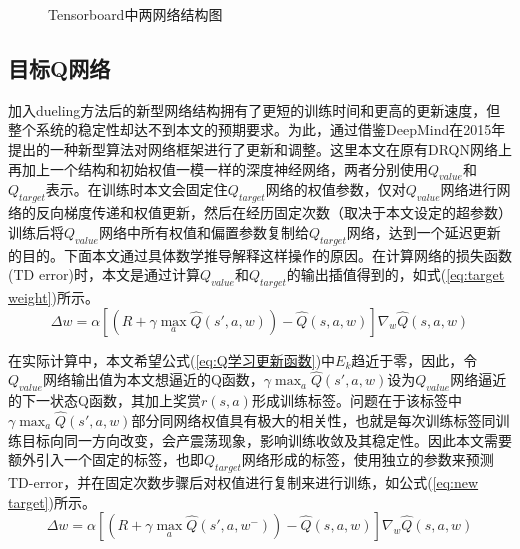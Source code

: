 \begin{figure}[htbp]
	\begin{minipage}{\textwidth}
		\centering
		\subfigure{\label{fig:tensorboard_q_net}}\addtocounter{subfigure}{-2}
		\hspace{1em}
		\subfigure{\label{fig:tensorboard_q_target}}\addtocounter{subfigure}{-2}
		\hspace{1em}	
	\end{minipage}
	\vspace{0.2em}
	\caption{Tensorboard中两网络结构图}\label{fig:target网络}
\end{figure}

\subsection{目标Q网络}
加入dueling方法后的新型网络结构拥有了更短的训练时间和更高的更新速度，但整个系统的稳定性却达不到本文的预期要求。为此，通过借鉴DeepMind在2015年提出的一种新型算法对网络框架进行了更新和调整。这里本文在原有DRQN网络上再加上一个结构和初始权值一模一样的深度神经网络，两者分别使用$Q_{value}$和$Q_{target}$表示。在训练时本文会固定住$Q_{target}$网络的权值参数，仅对$Q_{value}$网络进行网络的反向梯度传递和权值更新，然后在经历固定次数（取决于本文设定的超参数）训练后将$Q_{value}$网络中所有权值和偏置参数复制给$Q_{target}$网络，达到一个延迟更新的目的。下面本文通过具体数学推导解释这样操作的原因。在计算网络的损失函数(TD error)时，本文是通过计算$Q_{value}$和$Q_{target}$的输出插值得到的，如式(\ref{eq:target weight})所示。
\begin{equation}\label{eq:target weight}
\Delta w=\alpha\left [ \left ( R+\gamma\max _{a} \hat{Q}\left ( {s}' ,a,w\right )\right )- \hat{Q}\left ( s ,a,w\right )\right ]\nabla_{w}\hat{Q}\left ( s,a,w \right )
\end{equation}


在实际计算中，本文希望公式(\ref{eq:Q学习更新函数})中$E_{k}$趋近于零，因此，令$Q_{value}$网络输出值为本文想逼近的Q函数，$\gamma\max _{a} \hat{Q}\left ( {s}' ,a,w\right )$设为$Q_{value}$网络逼近的下一状态Q函数，其加上奖赏$r(s,a)$形成训练标签。问题在于该标签中$\gamma\max_{a}\hat{Q}\left ( {s}' ,a,w \right )$部分同网络权值具有极大的相关性，也就是每次训练标签同训练目标向同一方向改变，会产震荡现象，影响训练收敛及其稳定性。因此本文需要额外引入一个固定的标签，也即$Q_{target}$网络形成的标签，使用独立的参数来预测TD-error，并在固定次数步骤后对权值进行复制来进行训练，如公式(\ref{eq:new target})所示。
\begin{equation}\label{eq:new target}
\Delta w=\alpha\left [ \left ( R+\gamma\max _{a} \hat{Q}\left ( {s}' ,a,w^{-}\right )\right )- 	\hat{Q}\left ( s ,a,w\right )\right ]\nabla_{w}\hat{Q}\left ( s,a,w \right )
\end{equation}

